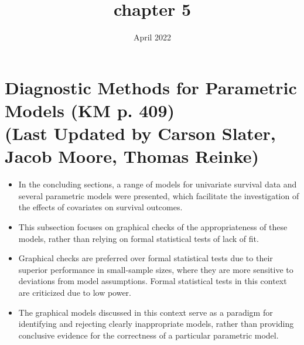 \documentclass[10pt]{article}\usepackage[]{graphicx}\usepackage[]{xcolor}
\title{chapter 5}
\date{April 2022}
\theoremstyle{definition}
\numberwithin{equation}{subsection}
\numberwithin{figure}{section}
\numberwithin{table}{subsection}
\numberwithin{Report}{section}
\numberwithin{Example}{subsection}
\begin{document}
\tableofcontents

\newpage

\section{Diagnostic Methods for Parametric Models (KM p. 409) \\
\small{(Last Updated by Carson Slater, Jacob Moore, Thomas Reinke)}} 
\normalsize




\begin{itemize}
\item In the concluding sections, a range of models for univariate survival data and several parametric models were presented, which facilitate the investigation of the effects of covariates on survival outcomes.
\item This subsection focuses on graphical checks of the appropriateness of these models, rather than relying on formal statistical tests of lack of fit.
\item Graphical checks are preferred over formal statistical tests due to their superior performance in small-sample sizes, where they are more sensitive to deviations from model assumptions. Formal statistical tests in this context are criticized due to low power.
\item The graphical models discussed in this context serve as a paradigm for identifying and rejecting clearly inappropriate models, rather than providing conclusive evidence for the correctness of a particular parametric model.
\end{itemize}
\end{document}
